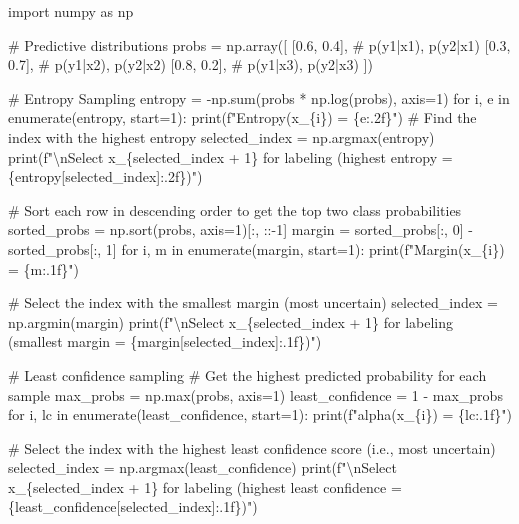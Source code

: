 \documentclass[
  letterpaper,
  numbers=noenddot,
  DIV=11]{scrreprt}
\newenvironment{Shaded}{\begin{snugshade}}{\end{snugshade}}
\newcommand{\NormalTok}[1]{\textcolor[rgb]{0.00,0.23,0.31}{#1}}
\theoremstyle{plain}
\theoremstyle{definition}
\theoremstyle{remark}
\begin{document}
\begin{tcolorbox}[colframe=.grey, title=\faCode \enspace Code]

\begin{Shaded}
\begin{Highlighting}[numbers=left,,]
\NormalTok{import numpy as np}

\NormalTok{\# Predictive distributions}
\NormalTok{probs = np.array([}
\NormalTok{    [0.6, 0.4],  \# p(y1|x1), p(y2|x1)}
\NormalTok{    [0.3, 0.7],  \# p(y1|x2), p(y2|x2)}
\NormalTok{    [0.8, 0.2],  \# p(y1|x3), p(y2|x3)}
\NormalTok{])}

\NormalTok{\# Entropy Sampling}
\NormalTok{entropy = {-}np.sum(probs * np.log(probs), axis=1)}
\NormalTok{for i, e in enumerate(entropy, start=1):}
\NormalTok{    print(f"Entropy(x\_\{i\}) = \{e:.2f\}")}
\NormalTok{\# Find the index with the highest entropy}
\NormalTok{selected\_index = np.argmax(entropy)}
\NormalTok{print(f"\textbackslash{}nSelect x\_\{selected\_index + 1\} for labeling (highest entropy = \{entropy[selected\_index]:.2f\})")}

\NormalTok{\# Sort each row in descending order to get the top two class probabilities}
\NormalTok{sorted\_probs = np.sort(probs, axis=1)[:, ::{-}1]}
\NormalTok{margin = sorted\_probs[:, 0] {-} sorted\_probs[:, 1]}
\NormalTok{for i, m in enumerate(margin, start=1):}
\NormalTok{    print(f"Margin(x\_\{i\}) = \{m:.1f\}")}

\NormalTok{\# Select the index with the smallest margin (most uncertain)}
\NormalTok{selected\_index = np.argmin(margin)}
\NormalTok{print(f"\textbackslash{}nSelect x\_\{selected\_index + 1\} for labeling (smallest margin = \{margin[selected\_index]:.1f\})")}

\NormalTok{\# Least confidence sampling}
\NormalTok{\# Get the highest predicted probability for each sample}
\NormalTok{max\_probs = np.max(probs, axis=1)}
\NormalTok{least\_confidence = 1 {-} max\_probs}
\NormalTok{for i, lc in enumerate(least\_confidence, start=1):}
\NormalTok{    print(f"alpha(x\_\{i\}) = \{lc:.1f\}")}

\NormalTok{\# Select the index with the highest least confidence score (i.e., most uncertain)}
\NormalTok{selected\_index = np.argmax(least\_confidence)}
\NormalTok{print(f"\textbackslash{}nSelect x\_\{selected\_index + 1\} for labeling (highest least confidence = \{least\_confidence[selected\_index]:.1f\})")}
\end{Highlighting}
\end{Shaded}

\end{tcolorbox}
\end{document}
